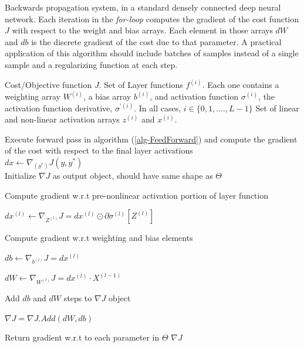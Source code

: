 \documentclass[12pt,letterpaper]{article}
\begin{document}
\begin{algorithm}[H]
\caption{Backwards propagation system, in a standard densely connected deep neural network. Each iteration in the \textit{for-loop} computes the gradient of the cost function $J$ with respect to the weight and bias arrays. Each element in those arrays $dW$ and $db$ is the discrete gradient of the cost due to that parameter. A practical application of this algorithm should include batches of samples instead of a single sample and a regularizing function at each step.}
\label{algBackProp}

\begin{algorithmic}
\REQUIRE Cost/Objective function $J$.
\REQUIRE Set of Layer functions $f^{(i)}$. Each one contains a weighting array $W^{(i)}$, a bias array $b^{(i)}$, and activation function $\sigma^{(i)}$, the activation function derivative, $\sigma^{'(i)}$. In all cases, $i \in \{0,1,....,L-1\}$
\REQUIRE Set of linear and non-linear activation arrays $z^{(i)}$ and $x^{(i)}$.

Execute forward pass in algorithm (\ref{alg-FeedForward}) and compute the gradient of the cost with respect to the final layer activations \\
$dx \leftarrow \nabla_{(y^*)}J(y,y^*)$ \\
Initialize $\nabla J$ as output object, should have same shape as $\Theta$

	\item Compute gradient w.r.t pre-nonlinear activation portion of layer function
	\item $dx^{(l)} \leftarrow \nabla_{Z^{(l)}}J = dx^{(l)} \odot \partial\sigma^{(l)}[ Z^{(l)} ]$
	\item Compute gradient w.r.t weighting and bias elements
	\item $db \leftarrow \nabla_{b^{(l)}}J = dx^{(l)}$
	\item $dW \leftarrow \nabla_{W^{(l)}}J = dx^{(l)} \cdot X^{(l-1)}$

	\item Add $db$ and $dW$ steps to $\nabla J$ object
	\item $\nabla J = \nabla J .Add(dW,db)$
\ENDFOR

\item Return gradient w.r.t to each parameter in $\Theta$
\RETURN $\nabla J$

\end{algorithmic}
\end{algorithm}
\end{document}
